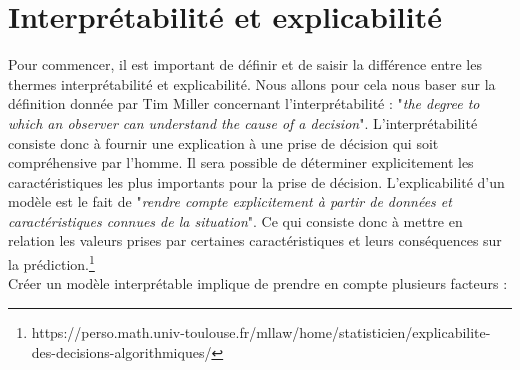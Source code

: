 \section{Interprétabilité et explicabilité}
Pour commencer, il est important de définir et de saisir la différence entre les thermes interprétabilité et explicabilité. Nous allons pour cela nous baser sur la définition donnée par Tim Miller concernant l'interprétabilité \cite{interpretDef} : "\textit{the degree to which an observer can understand the cause of a decision}". L'interprétabilité consiste donc à fournir une explication à une prise de décision qui soit compréhensive par l'homme. Il sera possible de déterminer explicitement les caractéristiques les plus importants pour la prise de décision. L'explicabilité d'un modèle est le fait de "\textit{rendre compte explicitement à partir de données et caractéristiques connues de la situation}". Ce qui consiste donc à mettre en relation les valeurs prises par certaines caractéristiques et leurs conséquences sur la prédiction.\footnote{https://perso.math.univ-toulouse.fr/mllaw/home/statisticien/explicabilite-des-decisions-algorithmiques/}\\
Créer un modèle interprétable implique de prendre en compte plusieurs facteurs :\par
